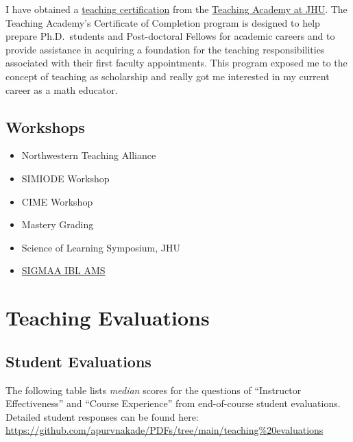 \documentclass[
]{report}
\providecommand{\tightlist}{%
  \setlength{\itemsep}{0pt}\setlength{\parskip}{0pt}}
\begin{document}
I have obtained a \href{https://ctei.jhu.edu/teaching-academy/coc}{teaching certification} from the
\href{https://ctei.jhu.edu/teaching-academy}{Teaching Academy at JHU}. The Teaching Academy's Certificate
of Completion program is designed to help prepare Ph.D.~students and Post-doctoral Fellows for
academic careers and to provide assistance in acquiring a foundation for the teaching
responsibilities associated with their first faculty appointments. This program exposed me to the
concept of teaching as scholarship and really got me interested in my current career as a math
educator.

\hypertarget{workshops}{%
\section{Workshops}\label{workshops}}

\begin{itemize}
\tightlist
\item
  Northwestern Teaching Alliance
\item
  SIMIODE Workshop
\item
  CIME Workshop
\item
  Mastery Grading
\item
  Science of Learning Symposium, JHU
\item
  \href{https://www.maa.org/member-communities/sigmaas}{SIGMAA IBL AMS}
\end{itemize}

\hypertarget{teaching-evaluations}{%
\chapter{Teaching Evaluations}\label{teaching-evaluations}}

\hypertarget{student-evaluations}{%
\section{Student Evaluations}\label{student-evaluations}}

The following table lists \emph{median} scores for the questions of ``Instructor Effectiveness'' and ``Course Experience'' from end-of-course student evaluations. Detailed student responses can be found here: \url{https://github.com/apurvnakade/PDFs/tree/main/teaching\%20evaluations}
\end{document}
